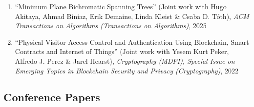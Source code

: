 \documentclass[letterpaper,11pt]{article}
\makeatletter
\newcommand{\resumeSubHeadingListStart}{\begin{itemize}[leftmargin=*]}
\newcommand{\resumeSubHeadingListEnd}{\end{itemize}}
\newcommand{\publication}[6]{
  \item ``#1'' %
   (Joint work with#2), %
     \emph{#3}, %
      #4%


}
\newcommand{\pdficon}{\faFilePdf}
\newcommand{\doilabel}{\texttt{DOI}}
\makeatother
\begin{document}
    \begin{enumerate}
    \setcounter{enumi}{\value{pubnum}}
      
        \publication
          {Minimum Plane Bichromatic Spanning Trees}
          {
 Hugo Akitaya, Ahmad Biniaz, Erik Demaine, Linda Kleist \& Csaba D. Tóth}
          {ACM Transactions on Algorithms (Transactions on Algorithms)}
          {2025}
          {%
\href{https://dl.acm.org/doi/pdf/10.1145/3747591}{\pdficon}%
%
\quad\href{https://doi.org/10.1145/3747591}{\doilabel}%
          }
          {1}
 \vspace{-.5em}  
      
        \publication
          {Physical Visitor Access Control and Authentication Using Blockchain, Smart Contracts and Internet of Things}
          {
 Yesem Kurt Peker, Alfredo J. Perez \& Jarel Hearst}
          {Cryptography (MDPI), Special Issue on Emerging Topics in Blockchain Security and Privacy (Cryptography)}
          {2022}
          {%
\href{https://www.mdpi.com/2410-387X/6/4/65}{\pdficon}%
%
\quad\href{https://doi.org/10.3390/cryptography6040065}{\doilabel}%
          }
          {2}
 
    \setcounter{pubnum}{\value{enumi}}
    \end{enumerate}
    \subsection*{Conference Papers}%
  
\end{document}
